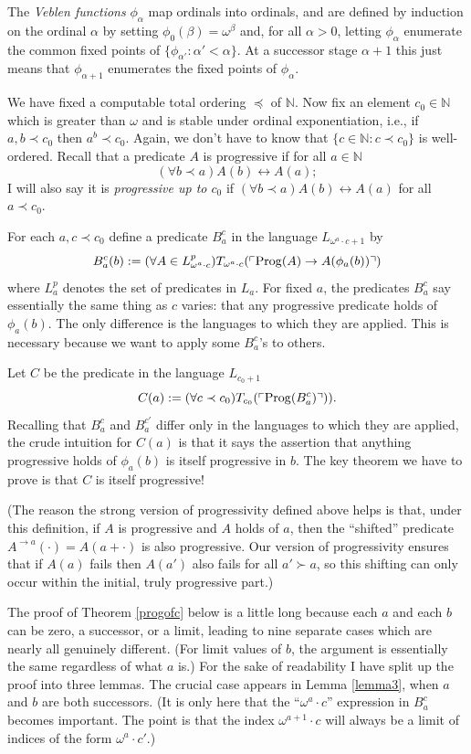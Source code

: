 \documentclass{amsart}
\begin{document}
The {\it Veblen functions} $\phi_\alpha$ map ordinals into ordinals, and are defined by induction on the
ordinal $\alpha$ by setting $\phi_0(\beta) = \omega^\beta$ and, for all $\alpha > 0$, letting $\phi_\alpha$
enumerate the common fixed points of $\{\phi_{\alpha'}: \alpha' < \alpha\}$. At a successor stage
$\alpha + 1$ this just means that $\phi_{\alpha + 1}$ enumerates the fixed points of $\phi_\alpha$.

We have fixed a computable total ordering $\preceq$ of $\mathbb{N}$. Now fix an element
$c_0 \in \mathbb{N}$ which is greater than $\omega$ and is stable under ordinal exponentiation, i.e.,
if $a,b \prec c_0$ then $a^b \prec c_0$. Again, we don't have to know that $\{c \in \mathbb{N}: c \prec c_0\}$
is well-ordered. Recall that a predicate $A$ is progressive if for all $a \in \mathbb{N}$
$$(\forall b \prec a)A(b) \leftrightarrow A(a);$$
I will also say it is {\it progressive up to $c_0$} if $(\forall b \prec a)A(b) \leftrightarrow A(a)$
for all $a \prec c_0$.

For each $a,c \prec c_0$ define a predicate $B_a^c$ in the language $L_{\omega^a\cdot c + 1}$ by
$$B_a^c(b) := (\forall A \in L_{\omega^a\cdot c}^p)
T_{\omega^a\cdot c}(\ulcorner{\rm Prog}(A) \to A(\phi_a(b))\urcorner)$$
where $L_a^p$ denotes the set of predicates in $L_a$. For fixed $a$, the predicates $B_a^c$ say
essentially the same thing as $c$ varies: that any progressive predicate holds of $\phi_a(b)$. The only
difference is the languages to which they are
applied. This is necessary because we want to apply some $B_a^c$'s to others.

Let $C$ be the predicate in the language $L_{c_0+1}$
$$C(a) := (\forall c \prec c_0)T_{c_0}(\ulcorner {\rm Prog}(B_a^c)\urcorner)).$$
Recalling that $B_a^c$ and $B_a^{c'}$ differ only
in the languages to which they are applied, the crude intuition for $C(a)$ is that it says the assertion
that anything progressive holds of $\phi_a(b)$ is itself progressive in $b$. The key theorem we have to
prove is that $C$ is itself progressive!

(The reason the strong version of progressivity defined above helps is that, under this definition, if
$A$ is progressive and $A$ holds of $a$, then the ``shifted'' predicate $A^{\to a}(\cdot) =
A(a + \cdot)$ is also progressive. Our version of progressivity ensures that if $A(a)$ fails
then $A(a')$ also fails for all $a' \succ a$, so this shifting can only occur within the initial,
truly progressive part.)

The proof of Theorem \ref{progofc} below is a little long because each $a$ and each $b$ can be zero,
a successor, or a limit, leading to nine separate cases which are nearly all genuinely different. (For limit
values of $b$, the argument is essentially the same regardless of what $a$ is.)
For the sake of readability I have split up the proof into three lemmas.
The crucial case appears in Lemma \ref{lemma3}, when $a$ and $b$ are both successors. (It is
only here that the ``$\omega^a\cdot c$'' expression in $B_a^c$ becomes important. The point is
that the index $\omega^{a+1}\cdot c$ will always be a limit of indices of the form $\omega^a\cdot c'$.)
\end{document}
